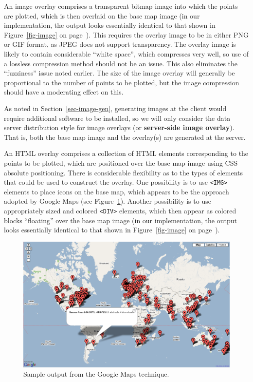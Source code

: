 \documentclass[acmnow]{acmtrans2m}
\begin{document}
An image overlay comprises a transparent bitmap image into which the
points are plotted, which is then overlaid on the base map image (in our
implementation, the output looks essentially identical to that shown in
Figure~\ref{fig-image} on page~\pageref{fig-image}). This requires the
overlay image to be in either PNG or GIF format, as JPEG does not
support transparency. The overlay image is likely to contain
considerable ``white space'', which compresses very well, so use of a
lossless compression method should not be an issue. This also eliminates
the ``fuzziness'' issue noted earlier.
The size of the image overlay will
generally be proportional to the number of points to be plotted, but the
image compression should have a moderating effect on this.

As noted in Section~\ref{sec-image-gen}, generating images at the client
would require additional software to be installed, so we will only
consider the data server distribution style for image overlays (or
\textbf{server-side image overlay}). That is, both the base map image
and the overlay(s) are generated at the server.

An HTML overlay comprises a collection of HTML elements corresponding to
the points to be plotted, which are positioned over the base map image
using CSS absolute positioning. There is considerable flexibility as to
the types of elements that could be used to construct the overlay. One
possibility is to use \verb|<IMG>| elements to place icons on the base
map, which appears to be the approach adopted by Google Maps (see
Figure~\ref{fig-google}). Another possibility is to use appropriately
sized and colored \verb|<DIV>| elements, which then appear as colored
blocks ``floating'' over the base map image (in our implementation, the
output looks essentially identical to that shown in
Figure~\ref{fig-image} on page~\pageref{fig-image}).


\begin{figure}
	\centering
	\includegraphics[width=\textwidth,keepaspectratio]{GoogleMap-full.png}
	\caption{Sample output from the Google Maps technique.}
	\label{fig-google}
\end{figure}
\end{document}
